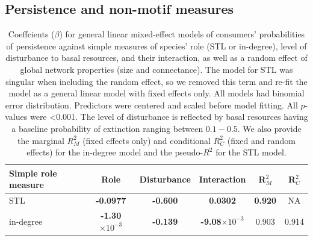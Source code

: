 \documentclass[12pt]{article}
\begin{document}
\begin{spacing}{2.0}
    \subsection{Persistence and non-motif measures}

    \begin{table}[hb!]
        \caption{Coeffcients ($\beta$) for general linear mixed-effect models of consumers' probabilities of persistence against simple measures of species' role (STL or in-degree), level of disturbance to basal resources, and their interaction, as well as a random effect of global network properties (size and connectance). The model for STL was singular when including the random effect, so we removed this term and re-fit the model as a general linear model with fixed effects only. All models had binomial error distribution. Predictors were centered and scaled before model fitting. All $p$-values were \textless0.001. The level of disturbance is reflected by basal resources having a baseline probability of extinction ranging between $0.1 - 0.5$.  We also provide the marginal $R^2_M$ (fixed effects only) and conditional $R^2_C$ (fixed and random effects) for the in-degree model and the pseudo-$R^2$ for the STL model.}
        \label{tab:per_vs_TLdeg}
        \centering
        \begin{tabular}{l|c  c  c | c c  }
            Simple role measure & Role & Disturbance & Interaction & R$^2_M$ & R$^2_C$ \\
            \hline
            STL & \textbf{-0.0977} & \textbf{-0.600} & \textbf{0.0302} & \textbf{0.920} & NA \\
            in-degree & \textbf{-1.30$\times10^{-3}$} & \textbf{-0.139} & \textbf{-9.08$\times10^{-3}$} & 0.903 & 0.914 \\
        \end{tabular}
    \end{table}



\end{spacing}
\end{document}
